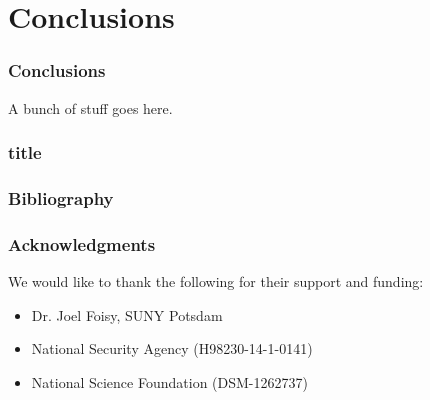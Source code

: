 \section{Conclusions}

\begin{frame}
  \frametitle{Conclusions}

  A bunch of stuff goes here.

\end{frame}

\begin{frame}
  \frametitle{title}
  
\end{frame}

\begin{frame}
  \frametitle{Bibliography}
  
\end{frame}

\begin{frame}
  \frametitle{Acknowledgments}
  
  We would like to thank the following for their support and funding: 
  
 \begin{itemize}
 \item Dr. Joel Foisy, SUNY Potsdam
 \item National Security Agency (H98230-14-1-0141)
 \item National Science Foundation (DSM-1262737)
 \end{itemize}
\end{frame}



